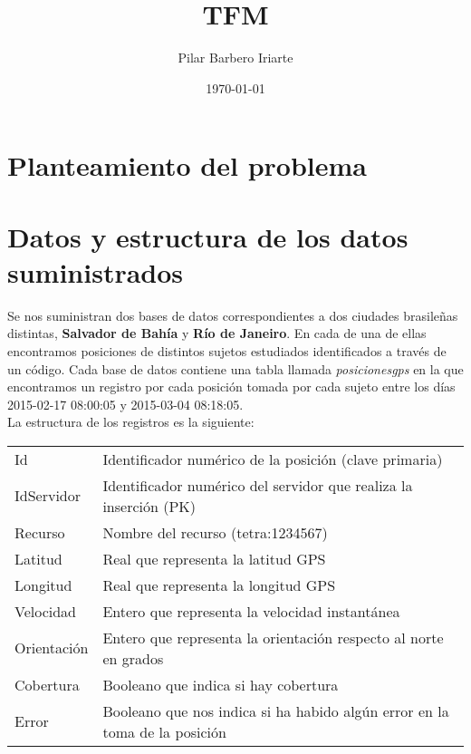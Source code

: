 \documentclass[a4paper, 12pt]{article}
\title{TFM}
\author{Pilar Barbero Iriarte}
\date{\today}
\begin{document}
\maketitle

\newpage

\tableofcontents

\pagebreak

\newpage

\section{Planteamiento del problema}

\section{Datos y estructura de los datos suministrados}

Se nos suministran dos bases de datos correspondientes a dos ciudades brasile\~nas distintas, \textbf{Salvador de Bah\'ia} y \textbf{R\'io de Janeiro}. En cada de una de ellas encontramos posiciones de distintos sujetos estudiados identificados a trav\'es de un c\'odigo. Cada base de datos contiene una tabla llamada \textit{posicionesgps} en la que encontramos un registro por cada posici\'on tomada por cada sujeto entre los d\'ias 2015-02-17 08:00:05 y 2015-03-04 08:18:05. \\

La estructura de los registros es la siguiente:\\

\begin{center}
	\begin{tabular}{| l | l  |}
	\hline
	\rowcolor{LightCyan}
	\hline
  		\multicolumn{2}{|l|}{Par\'ametros} \\
	\hline
	Id & Identificador num\'erico de la posici\'on (clave primaria) \\
	IdServidor & Identificador num\'erico del servidor que realiza la inserci\'on (PK) \\
	Recurso & Nombre del recurso (tetra:1234567) \\
	Latitud & Real que representa la latitud GPS \\
	Longitud & Real que representa la longitud GPS \\
		Velocidad & Entero que representa la velocidad instant\'anea \\
	Orientaci\'on & Entero que representa la orientaci\'on respecto al norte en grados \\
	Cobertura & Booleano que indica si hay cobertura \\
	Error & Booleano que nos indica si ha habido alg\'un error en la toma de la posici\'on \\
	\hline
	\end{tabular}

\end{center}
\end{document}
